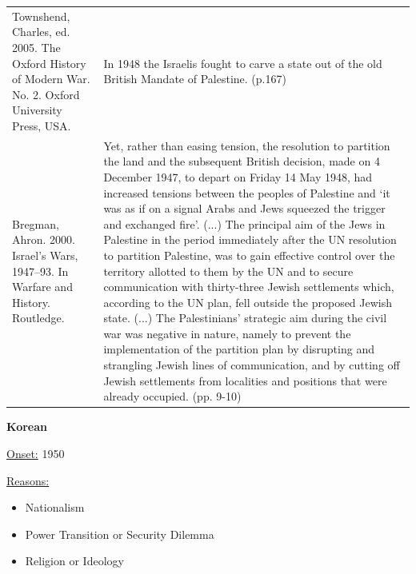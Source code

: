 {\begin{longtable}{p{}p{}}
\\
Townshend, Charles, ed. 2005. The Oxford History of Modern War. No. 2. Oxford University Press, USA. & In 1948 the Israelis fought to carve a state out of the old
British Mandate of Palestine. (p.167)
\\
Bregman, Ahron. 2000. Israel's Wars, 1947–93. In Warfare and History. Routledge. & Yet, rather than easing tension, the resolution to partition the land and the subsequent British decision, made on 4 December 1947, to depart on Friday 14 May 1948, had increased tensions between the peoples of Palestine and ‘it was as if on a signal Arabs and Jews squeezed the trigger and exchanged fire'. (...) The principal aim of the Jews in Palestine in the period immediately after the UN resolution to partition Palestine, was to gain effective control over the territory allotted to them by the UN and to secure communication with thirty-three Jewish settlements which, according to the UN plan, fell outside the proposed Jewish state. (...) The Palestinians' strategic aim during the civil war was negative in nature, namely to prevent the implementation of the partition plan by disrupting and strangling Jewish lines of communication, and by cutting off Jewish settlements from localities and positions that were already occupied. (pp. 9-10)
\\
\end{longtable}}
\clearpage
         \textbf{Korean} 

          \underline{Onset:} 1950         

\underline{Reasons:}
\begin{itemize}
\item Nationalism
\item Power Transition or Security Dilemma
\item Religion or Ideology
\end{itemize}

